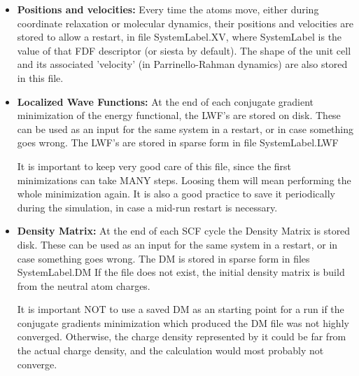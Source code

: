 \begin{itemize}
\item {\bf Positions and velocities:}
Every time the atoms move, either during coordinate relaxation or
molecular dynamics, their positions and velocities are stored
to allow a restart, in file SystemLabel.XV, where SystemLabel
is the value of that FDF descriptor (or siesta by default).
The shape of the
unit cell and its associated 'velocity' (in Parrinello-Rahman
dynamics) are also stored in this file.

\item {\bf Localized Wave Functions:} 
At the end of each conjugate gradient
minimization of the energy functional, the LWF's are
stored on disk. These can be used as an input for
the same system in a restart, or in case something goes
wrong.  The LWF's are stored in sparse form in
file SystemLabel.LWF

It is important to keep very good care of this file,
since the first minimizations can take MANY
steps. Loosing them will mean performing the 
whole minimization again. It is also a good practice 
to save it periodically during the
simulation, in case a mid-run restart is necessary.

\item {\bf Density Matrix:} At the end of each SCF cycle
the Density Matrix is stored
disk. These can be used as an input for
the same system in a restart, or in case something goes
wrong.  The DM is stored in sparse form in files
SystemLabel.DM
If the file does not exist, the initial density
matrix is build from the neutral atom charges.

It is important NOT to use a saved DM as an starting
point for a run if the conjugate gradients minimization
which produced the DM file was not highly converged.
Otherwise, the charge density represented by it
could be far from the actual charge density, and
the calculation would most probably not converge.
\end{itemize}


%
%
%
%


